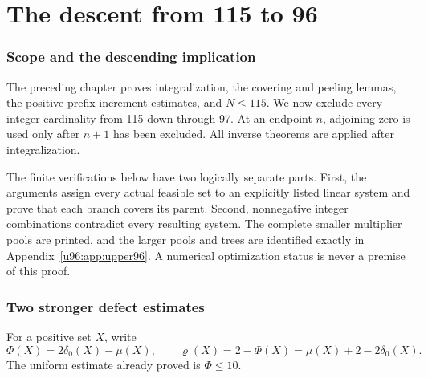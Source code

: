 \documentclass[11pt,a4paper]{article}
\theoremstyle{remark}
\newcommand{\rhoD}{\varrho}
\begin{document}
\clearpage\part{The descent from 115 to 96}\label{part:upper96}

\section{Scope and the descending implication}
The preceding chapter proves integralization, the covering and peeling
lemmas, the positive-prefix increment estimates, and $N\leq115$.
We now exclude every integer cardinality from 115 down through 97.
At an endpoint $n$, adjoining zero is used only after $n+1$ has been
excluded. All inverse theorems are applied after integralization.

The finite verifications below have two logically separate parts.
First, the arguments assign every actual feasible set to an explicitly
listed linear system and prove that each branch covers its parent.
Second, nonnegative integer combinations contradict every resulting
system. The complete smaller multiplier pools are printed, and the
larger pools and trees are identified exactly in Appendix~\ref{u96:app:upper96}.
A numerical optimization status is never a premise of this proof.

\section{Two stronger defect estimates}\label{u96:sec:new-defect}
For a positive set $X$, write
\[
\Phi(X)=2\delta_0(X)-\mu(X),\qquad
\rhoD(X)=2-\Phi(X)=\mu(X)+2-2\delta_0(X).
\]
The uniform estimate already proved is $\Phi\leq10$.
\end{document}
